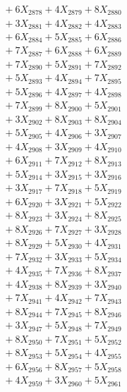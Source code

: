 \documentclass[a4paper,10pt]{article}
\begin{document}
{\begin{align}
&\;  + 6 X_{2878} + 4 X_{2879} + 8 X_{2880} \\[0.3ex]
&\;  + 3 X_{2881} + 4 X_{2882} + 4 X_{2883} \\[0.3ex]
&\;  + 6 X_{2884} + 5 X_{2885} + 6 X_{2886} \\[0.3ex]
&\;  + 7 X_{2887} + 6 X_{2888} + 6 X_{2889} \\[0.5ex]\allowbreak
&\;  + 7 X_{2890} + 5 X_{2891} + 7 X_{2892} \\[0.3ex]
&\;  + 5 X_{2893} + 4 X_{2894} + 7 X_{2895} \\[0.3ex]
&\;  + 5 X_{2896} + 4 X_{2897} + 4 X_{2898} \\[0.3ex]
&\;  + 7 X_{2899} + 8 X_{2900} + 5 X_{2901} \\[0.3ex]
&\;  + 3 X_{2902} + 8 X_{2903} + 8 X_{2904} \\[0.3ex]
&\;  + 5 X_{2905} + 4 X_{2906} + 3 X_{2907} \\[0.3ex]
&\;  + 4 X_{2908} + 3 X_{2909} + 4 X_{2910} \\[0.3ex]
&\;  + 6 X_{2911} + 7 X_{2912} + 8 X_{2913} \\[0.3ex]
&\;  + 5 X_{2914} + 3 X_{2915} + 3 X_{2916} \\[0.3ex]
&\;  + 3 X_{2917} + 7 X_{2918} + 5 X_{2919} \\[0.5ex]\allowbreak
&\;  + 6 X_{2920} + 3 X_{2921} + 5 X_{2922} \\[0.3ex]
&\;  + 8 X_{2923} + 3 X_{2924} + 8 X_{2925} \\[0.3ex]
&\;  + 8 X_{2926} + 7 X_{2927} + 3 X_{2928} \\[0.3ex]
&\;  + 8 X_{2929} + 5 X_{2930} + 4 X_{2931} \\[0.3ex]
&\;  + 7 X_{2932} + 3 X_{2933} + 5 X_{2934} \\[0.3ex]
&\;  + 4 X_{2935} + 7 X_{2936} + 8 X_{2937} \\[0.3ex]
&\;  + 4 X_{2938} + 8 X_{2939} + 3 X_{2940} \\[0.3ex]
&\;  + 7 X_{2941} + 4 X_{2942} + 7 X_{2943} \\[0.3ex]
&\;  + 8 X_{2944} + 7 X_{2945} + 8 X_{2946} \\[0.3ex]
&\;  + 3 X_{2947} + 5 X_{2948} + 7 X_{2949} \\[0.5ex]\allowbreak
&\;  + 8 X_{2950} + 7 X_{2951} + 5 X_{2952} \\[0.3ex]
&\;  + 8 X_{2953} + 5 X_{2954} + 4 X_{2955} \\[0.3ex]
&\;  + 6 X_{2956} + 8 X_{2957} + 5 X_{2958} \\[0.3ex]
&\;  + 4 X_{2959} + 3 X_{2960} + 5 X_{2961} \\[0.3ex]

\end{align}}
\end{document}
